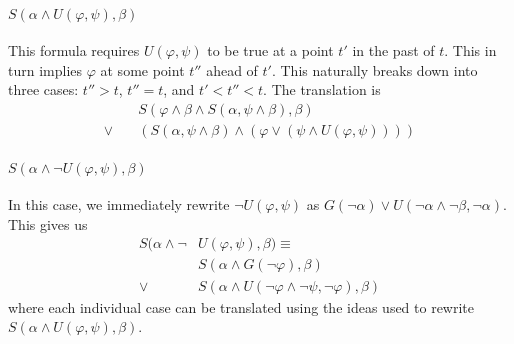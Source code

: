 \documentclass[a4paper,UKenglish,cleveref, autoref, thm-restate]{lipics-v2021}
\begin{document}
\paragraph*{$S(\alpha \land U(\varphi, \psi), \beta)$}
This formula requires $U(\varphi, \psi)$ to be true at a point $t'$ in the past of $t$. This in turn implies $\varphi$ at some point $t''$ ahead of $t'$. This naturally breaks down into three cases: $t'' > t$, $t'' = t$, and $t' < t'' < t$. The translation is
\begin{equation*}
    \begin{aligned}
        &S(\varphi \land \beta \land S(\alpha, \psi \land \beta), \beta)\\
        \lor \quad &\left(S(\alpha, \psi \land \beta) \land \left(\varphi \lor \left(\psi \land U(\varphi, \psi) \right) \right) \right)
    \end{aligned}
\end{equation*}

\paragraph*{$S(\alpha \land \lnot U(\varphi, \psi), \beta)$}
In this case, we immediately rewrite $\lnot U(\varphi, \psi)$ as $G(\lnot \alpha) \lor U(\lnot \alpha \land \lnot \beta, \lnot \alpha)$. This gives us
\begin{equation*}
    \begin{aligned}
        S(\alpha \land \lnot &U(\varphi, \psi), \beta) \equiv\\
        &S(\alpha \land G(\lnot \varphi), \beta) \\
        \lor \quad &S(\alpha \land U(\lnot \varphi \land \lnot \psi, \lnot \varphi), \beta)
    \end{aligned}
\end{equation*}
where each individual case can be translated using the ideas used to rewrite $S(\alpha \land U(\varphi, \psi), \beta)$.
\end{document}
